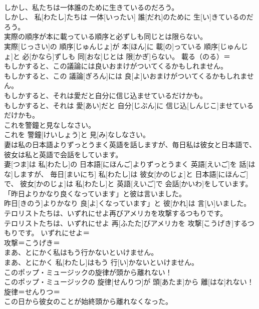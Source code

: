 \documentclass[8pt]{extreport}
\begin{document}
\begin{CJK}{UTF8}{min}
\\	しかし、私たちは一体誰のために生きているのだろう。	
\\	しかし、 私[わたし]たちは 一体[いったい] 誰[だれ]のために 生[い]きているのだろう。	
\\	実際の順序が本に載っている順序と必ずしも同じとは限らない。	
\\	実際[じっさい]の 順序[じゅんじょ]が 本[ほん]に 載[の]っている 順序[じゅんじょ]と 必[かなら]ずしも 同[おな]じとは 限[かぎ]らない。	載る（のる）＝ 
\\	もしかすると、この議論には良いおまけがついてくるかもしれません。	
\\	もしかすると、この 議論[ぎろん]には 良[よ]いおまけがついてくるかもしれません。	
\\	もしかすると、それは愛だと自分に信じ込ませているだけかも。	
\\	もしかすると、それは 愛[あい]だと 自分[じぶん]に 信じ込[しんじこ]ませているだけかも。	
\\	これを警鐘と見なしなさい。	
\\	これを 警鐘[けいしょう]と 見[み]なしなさい。	
\\	妻は私の日本語よりずっとうまく英語を話しますが、毎日私は彼女と日本語で、彼女は私と英語で会話をしています。	
\\	妻[つま]は 私[わたし]の 日本語[にほんご]よりずっとうまく 英語[えいご]を 話[はな]しますが、 毎日[まいにち] 私[わたし]は 彼女[かのじょ]と 日本語[にほんご]で、 彼女[かのじょ]は 私[わたし]と 英語[えいご]で 会話[かいわ]をしています。	
\\	「昨日よりかなり良くなっています」と彼は言いました。	
\\	昨日[きのう]よりかなり 良[よ]くなっています」と 彼[かれ]は 言[い]いました。	
\\	テロリストたちは、いずれにせよ再びアメリカを攻撃するつもりです。	
\\	テロリストたちは、いずれにせよ 再[ふたた]びアメリカを 攻撃[こうげき]するつもりです。	いずれにせよ＝ 
\\	攻撃＝こうげき＝ 
\\	まあ、とにかく私はもう行かないといけません。	
\\	まあ、とにかく 私[わたし]はもう 行[い]かないといけません。	
\\	このポップ・ミュージックの旋律が頭から離れない！	
\\	このポップ・ミュージックの 旋律[せんりつ]が 頭[あたま]から 離[はな]れない！	旋律＝せんりつ＝ 
\\	この日から彼女のことが始終頭から離れなくなった。	

\end{CJK}
\end{document}
